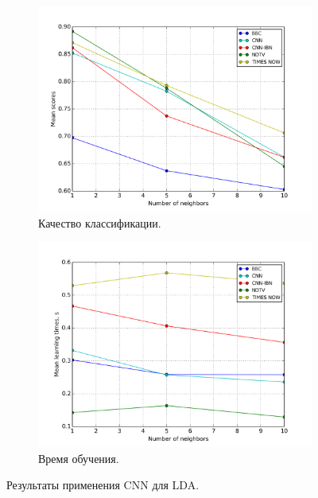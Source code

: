 \begin{figure}[h!]
	\centering
	\begin{subfigure}{0.45\textwidth}
		\includegraphics[width=\textwidth]{images/cnn-LDA.png}
		\caption{Качество классификации.}
	\end{subfigure}
	\begin{subfigure}{0.45\textwidth}
		\includegraphics[width=\textwidth]{images/cnn-LDATime.png}
		\caption{Время обучения.}
	\end{subfigure}
	\caption{Результаты применения CNN для LDA.}\label{fig:cnn-lda-results}
\end{figure}

